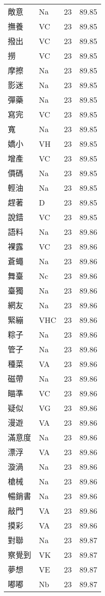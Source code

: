 \documentclass[twocolumn]{book}
\begin{document}
\begin{supertabular}{llrr}
敵意 & Na & 23 &  89.85\\
撫養 & VC & 23 &  89.85\\
撥出 & VC & 23 &  89.85\\
撈 & VC & 23 &  89.85\\
摩擦 & Na & 23 &  89.85\\
影迷 & Na & 23 &  89.85\\
彈藥 & Na & 23 &  89.85\\
寫完 & VC & 23 &  89.85\\
寬 & Na & 23 &  89.85\\
嬌小 & VH & 23 &  89.85\\
增產 & VC & 23 &  89.85\\
價碼 & Na & 23 &  89.85\\
輕油 & Na & 23 &  89.85\\
趕著 & D & 23 &  89.85\\
說錯 & VC & 23 &  89.85\\
語料 & Na & 23 &  89.86\\
裸露 & VC & 23 &  89.86\\
蒼蠅 & Na & 23 &  89.86\\
舞臺 & Nc & 23 &  89.86\\
臺獨 & Na & 23 &  89.86\\
網友 & Na & 23 &  89.86\\
緊繃 & VHC & 23 &  89.86\\
粽子 & Na & 23 &  89.86\\
管子 & Na & 23 &  89.86\\
種菜 & VA & 23 &  89.86\\
磁帶 & Na & 23 &  89.86\\
瞄準 & VC & 23 &  89.86\\
疑似 & VG & 23 &  89.86\\
漫遊 & VA & 23 &  89.86\\
滿意度 & Na & 23 &  89.86\\
漂浮 & VA & 23 &  89.86\\
漩渦 & Na & 23 &  89.86\\
槍械 & Na & 23 &  89.86\\
暢銷書 & Na & 23 &  89.86\\
敲門 & VA & 23 &  89.86\\
摸彩 & VA & 23 &  89.86\\
對聯 & Na & 23 &  89.87\\
察覺到 & VK & 23 &  89.87\\
夢想 & VE & 23 &  89.87\\
嘟嘟 & Nb & 23 &  89.87\\

\end{supertabular}
\end{document}
